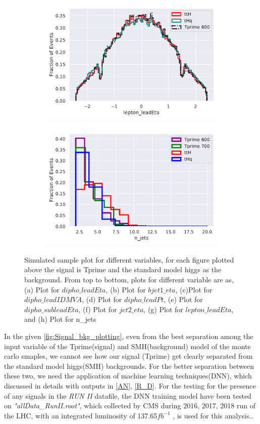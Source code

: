 \begin{figure}[H]
\begin{subfigure}{.5\textwidth}
  \centering
  \includegraphics[width=.8\linewidth]{Figure_2/lepton_leadEta.pdf}  
  \label{fig:sub-third}
\end{subfigure}
\begin{subfigure}{.5\textwidth}
  \centering
  \includegraphics[width=.8\linewidth]{Figure_2/n_jets.pdf}  
  \label{fig:sub-fourth}
\end{subfigure}
\caption{Simulated sample plot for different variables, for each figure plotted above the signal is Tprime and the standard model higgs as the background. From top to bottom, plots for different variable are as, (a) Plot for $dipho\_leadEta$, (b) Plot for $bjet1\_eta$, (c)Plot for $dipho\_leadIDMVA$, (d) Plot for $dipho\_leadPt$, (e) Plot for $dipho\_subleadEta$, (f) Plot for $jet2\_eta$, (g) Plot for $lepton\_leadEta$, and (h) Plot for n\_jets  }
\label{fig:Signal_bkg_plotting}
\end{figure}
 
In the given \autoref{fig:Signal_bkg_plotting}, even from the best separation among the input variable of the Tprime(signal) and SMH(background) model of the monte carlo smaples, we cannot see how our signal (Tprime) get clearly separated from the standard model higgs(SMH) backgrounds. 
For the better separation between these two, we need the application of machine learning techniques(DNN), which discussed in details with outputs in \autoref{AN}, \autoref{R_D}.
For the testing for the presence of any signals in the \textit{RUN II} datafile,  the DNN training model have been tested on \textit{"allData\_RunII.root"}, which collected by CMS during 2016, 2017, 2018 run of the LHC, with an integrated
luminosity of 137.65$fb^{-1}$ , is used for this analysis..




